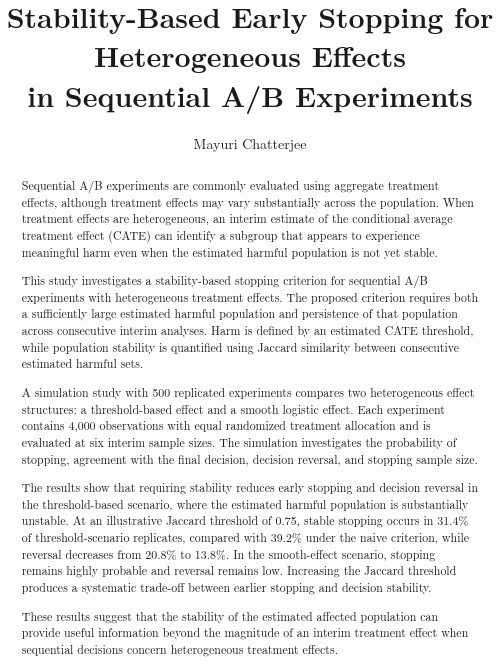 \documentclass[11pt,a4paper]{article}
\title{
\textbf{
Stability-Based Early Stopping for Heterogeneous Effects\\
in Sequential A/B Experiments
}
}
\author{
Mayuri Chatterjee
}
\date{}
\begin{document}
\maketitle


\begin{abstract}

Sequential A/B experiments are commonly evaluated using aggregate treatment
effects, although treatment effects may vary substantially across the
population. When treatment effects are heterogeneous, an interim estimate of
the conditional average treatment effect (CATE) can identify a subgroup that
appears to experience meaningful harm even when the estimated harmful
population is not yet stable.

This study investigates a stability-based stopping criterion for sequential
A/B experiments with heterogeneous treatment effects. The proposed criterion
requires both a sufficiently large estimated harmful population and
persistence of that population across consecutive interim analyses. Harm is
defined by an estimated CATE threshold, while population stability is
quantified using Jaccard similarity between consecutive estimated harmful
sets.

A simulation study with 500 replicated experiments compares two heterogeneous
effect structures: a threshold-based effect and a smooth logistic effect.
Each experiment contains 4,000 observations with equal randomized treatment
allocation and is evaluated at six interim sample sizes. The simulation
investigates the probability of stopping, agreement with the final decision,
decision reversal, and stopping sample size.

The results show that requiring stability reduces early stopping and decision
reversal in the threshold-based scenario, where the estimated harmful
population is substantially unstable. At an illustrative Jaccard threshold
of 0.75, stable stopping occurs in 31.4\% of threshold-scenario replicates,
compared with 39.2\% under the naive criterion, while reversal decreases from
20.8\% to 13.8\%. In the smooth-effect scenario, stopping remains highly
probable and reversal remains low. Increasing the Jaccard threshold produces
a systematic trade-off between earlier stopping and decision stability.

These results suggest that the stability of the estimated affected population
can provide useful information beyond the magnitude of an interim treatment
effect when sequential decisions concern heterogeneous treatment effects.

\end{abstract}
\end{document}
